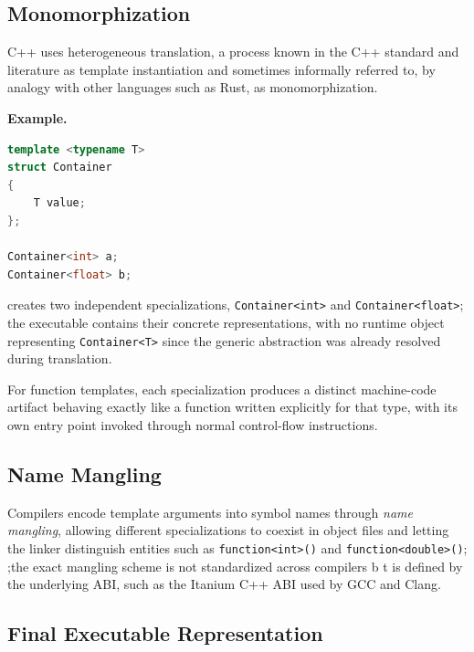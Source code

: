 \documentclass[11pt]{report}
\begin{document}
\subsection{Monomorphization}
\label{CppTemplates:RuntimeRepresentation:Monomorphization}

C++ uses heterogeneous translation, a process known in the C++ standard and
literature as template instantiation and sometimes informally referred to,
by analogy with other languages such as Rust, as monomorphization.

\begin{examplebox}
\textbf{Example.}

\begin{lstlisting}[language=C++]
template <typename T>
struct Container
{
    T value;
};

Container<int> a;
Container<float> b;
\end{lstlisting}

creates two independent specializations, \texttt{Container<int>} and
\texttt{Container<float>}; the executable contains their concrete
representations, with no runtime object representing \texttt{Container<T>} since
the generic abstraction was already resolved during translation.
\end{examplebox}

For function
templates, each specialization produces a distinct machine-code artifact behaving
exactly like a function written explicitly for that type, with its own entry
point invoked through normal control-flow instructions.

\subsection{Name Mangling}
\label{CppTemplates:RuntimeRepresentation:NameMangling}

Compilers encode template arguments into symbol names through \emph{name
mangling}, allowing different specializations to coexist in object files and
letting the linker distinguish entities such as \texttt{function<int>()} and
\texttt{function<double>()}; ;the exact mangling scheme is not standardized across compilers b
t is defined by the underlying ABI, such as the Itanium C++ ABI  used by GCC and Clang.

\subsection{Final Executable Representation}
\end{document}
